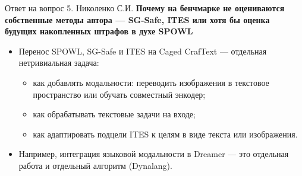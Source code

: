 \begin{frame}[noframenumbering]{Ответ на вопрос 5. Николенко С.И.}
    \textbf{Почему на бенчмарке не оцениваются собственные методы автора --- SG-Safe, ITES или хотя бы оценка будущих накопленных штрафов в духе SPOWL}

    \vspace{0.4em}
    \begin{itemize}
        \item Перенос SPOWL, SG-Safe и ITES на Caged CrafText --- отдельная
              нетривиальная задача:
              \begin{itemize}
                  \item как добавлять модальности: переводить изображения в
                        текстовое пространство или обучать совместный
                        энкодер;
                  \item как обрабатывать текстовые задачи на входе;
                  \item как адаптировать подцели ITES к целям в виде текста
                        или изображения.
              \end{itemize}
        \item Например, интеграция языковой модальности в Dreamer --- это
              отдельная работа и отдельный алгоритм (Dynalang).
    \end{itemize}
\end{frame}



